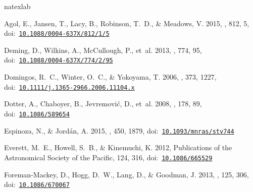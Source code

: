 \documentclass[twocolumn]{aastex62}
\begin{document}
 \newcommand{\noop}[1]{}
\begin{thebibliography}{}
\expandafter\ifx\csname natexlab\endcsname\relax\def\natexlab#1{#1}\fi
\providecommand{\url}[1]{\href{#1}{#1}}
\providecommand{\dodoi}[1]{doi:~\href{http://doi.org/#1}{\nolinkurl{#1}}}
\providecommand{\doeprint}[1]{\href{http://ascl.net/#1}{\nolinkurl{http://ascl.net/#1}}}
\providecommand{\doarXiv}[1]{\href{https://arxiv.org/abs/#1}{\nolinkurl{https://arxiv.org/abs/#1}}}

{Agol}, E., {Jansen}, T., {Lacy}, B., {Robinson}, T.~D., \& {Meadows}, V. 2015,
  \apj, 812, 5, \dodoi{10.1088/0004-637X/812/1/5}

{Deming}, D., {Wilkins}, A., {McCullough}, P., {et~al.} 2013, \apj, 774, 95,
  \dodoi{10.1088/0004-637X/774/2/95}

{Domingos}, R.~C., {Winter}, O.~C., \& {Yokoyama}, T. 2006, \mnras, 373, 1227,
  \dodoi{10.1111/j.1365-2966.2006.11104.x}

{Dotter}, A., {Chaboyer}, B., {Jevremovi{\'c}}, D., {et~al.} 2008, \apjs, 178,
  89, \dodoi{10.1086/589654}

{Espinoza}, N., \& {Jord{\'a}n}, A. 2015, \mnras, 450, 1879,
  \dodoi{10.1093/mnras/stv744}

{Everett}, M.~E., {Howell}, S.~B., \& {Kinemuchi}, K. 2012, Publications of the
  Astronomical Society of the Pacific, 124, 316, \dodoi{10.1086/665529}

{Foreman-Mackey}, D., {Hogg}, D.~W., {Lang}, D., \& {Goodman}, J. 2013, \pasp,
  125, 306, \dodoi{10.1086/670067}


\end{thebibliography}
\end{document}
